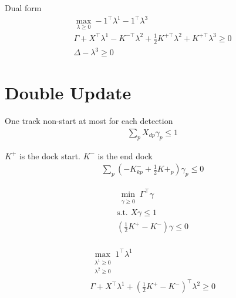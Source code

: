 \documentclass{article}
\begin{document}
Dual form
\begin{align}
\max_{\lambda \geq 0}-1^{\top }\lambda^1-1^{\top}\lambda^{3}\\
\nonumber \Gamma+X^{\top}\lambda^1-K^{-\top}\lambda^2+\frac{1}{2}K^{+\top}\lambda^2 +K^{+\top}\lambda^3\geq 0\\
\nonumber \Delta -\lambda^3 \geq 0
\end{align}


\section {Double Update}

One track non-start at most for each detection
\begin{align}
\sum_{p} X_{dp}\gamma_p \leq 1
\end{align}

$K^+$ is the dock start.  $K^-$ is the end dock
\begin{align}
\sum_{p}(-K^-_{kp}+\frac{1}{2}K+_p)\gamma_p \leq 0
\end{align}

\begin{align}
\min_{\substack{\gamma \geq 0 }}\Gamma^{\top}\gamma \\
\nonumber \mbox{s.t.   } X\gamma \leq 1\\
\nonumber (\frac{1}{2}K^+  -K^-)\gamma \leq 0\\
\end{align}

\begin{align}
\max_{\substack{\lambda^1 \geq 0 \\ \lambda^2 \geq 0}}1^{\top }\lambda^1\\
\nonumber \Gamma+X^\top \lambda^1+(\frac{1}{2}K^+ -K^-)^{\top}\lambda^2 \geq 0
\end{align}



\end{document}
